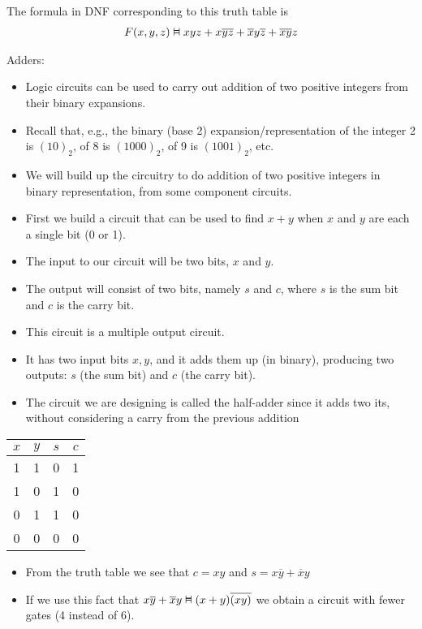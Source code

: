 \documentclass{article}
\newcommand{\vDashv}{%
  \mathrel{%
    \text{%
      \ooalign{$\vDash$\cr\reflectbox{$\vDash$}\cr}%
    }%
  }%
}
\begin{document}
The formula in DNF corresponding to this truth table is 
\begin{align*}
F(x,y,z) \vDashv xyz + x\overline{y}\overline{z} + \overline{x}y\overline{z} + \overline{x}\overline{y}z
\end{align*}


Adders:

\begin{itemize}
    \item Logic circuits can be used to carry out addition of two positive integers from their binary expansions.
    \item Recall that, e.g., the binary (base 2) expansion/representation of the integer 2 is $(10)_2$, of 8 is $(1000)_2$, of 9 is $(1001)_2$, etc.
    \item We will build up the circuitry to do addition of two positive integers in binary representation, from some component circuits.
    \item First we build a circuit that can be used to find $x + y$ when $x$ and $y$ are each a single bit (0 or 1).
    \item The input to our circuit will be two bits, $x$ and $y$. 
    \item The output will consist of two bits, namely $s$ and $c$, where $s$ is the sum bit and $c$ is the carry bit. 
    \item This circuit is a multiple output circuit.
    \item It has two input bits $x,y$, and it adds them up (in binary), producing two outputs: $s$ (the sum bit) and $c$ (the carry bit).
    \item The circuit we are designing is called the half-adder since it adds two its, without considering a carry from the previous addition
\end{itemize}


\begin{table}[h]
    \centering
    \begin{tabular}{|c|c|c|c|}\hline
         $x$&  $y$&  $s$& $c$\\\hline
         1&  1&  0& 1\\
         1&  0&  1& 0\\
         0&  1&  1& 0\\
         0&  0&  0& 0\\\hline
    \end{tabular}
\end{table}

\begin{itemize}
    \item From the truth table we see that $c = xy$ and $s = x\overline{y} + \overline{x}y$
    \item If we use this fact that $x\overline{y} + \overline{x}y \vDashv (x+y)\overline{(xy)}$ we obtain a circuit with fewer gates (4 instead of 6).
\end{itemize}
\end{document}
